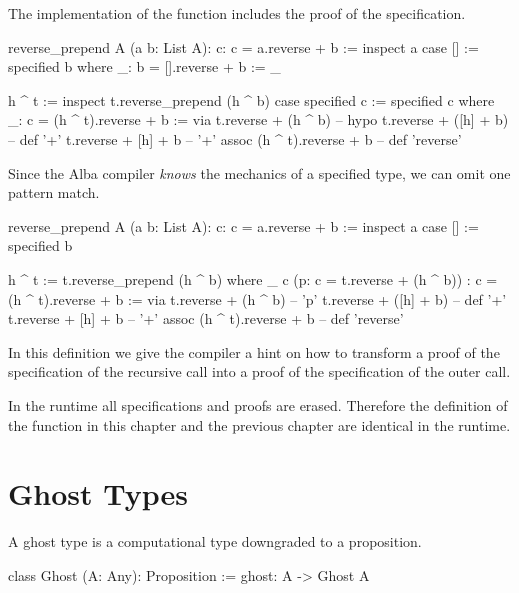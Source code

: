 The implementation of the function includes the proof of the specification.

\begin{alba}
  reverse_prepend A (a b: List A): {c: c = a.reverse + b} :=
    inspect a case
      [] :=
        specified b where
          _: b = [].reverse + b := _

      h ^ t :=
        inspect t.reverse_prepend (h ^ b) case
          specified c :=
            specified c where
              _: c = (h ^ t).reverse + b :=
                via t.reverse + (h ^ b)      -- hypo
                    t.reverse + ([h] + b)    -- def '+'
                    t.reverse + [h] + b      -- '+' assoc
                    (h ^ t).reverse + b      -- def 'reverse'
\end{alba}


Since the Alba compiler \emph{knows} the mechanics of a specified type, we can
omit one pattern match.

\begin{alba}
  reverse_prepend A (a b: List A): {c: c = a.reverse + b} :=
    inspect a case
      [] :=
        specified b

      h ^ t :=
        t.reverse_prepend (h ^ b) where
          _ c (p: c = t.reverse + (h ^ b))
            : c = (h ^ t).reverse + b :=
             via t.reverse + (h ^ b)      -- 'p'
                 t.reverse + ([h] + b)    -- def '+'
                 t.reverse + [h] + b      -- '+' assoc
                 (h ^ t).reverse + b      -- def 'reverse'
\end{alba}

In this definition we give the compiler a hint on how to transform a proof of
the specification of the recursive call into a proof of the specification of
the outer call.

In the runtime all specifications and proofs are erased. Therefore the
definition of the function  in this chapter and the
previous chapter are identical in the runtime.








\section{Ghost Types}

A ghost type is a computational type downgraded to a proposition.

\begin{alba}
    class
        Ghost (A: Any): Proposition
    :=
        ghost: A -> Ghost A
\end{alba}

